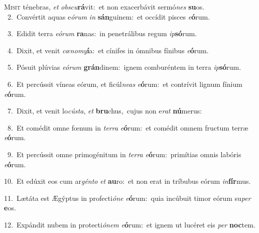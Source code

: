 \lettrine{\initial\textcolor{\initialcolor}{M}}{isit} ténebras, \textit{et} \textit{obs}\-\textit{cu}\textbf{rá}vit:~\star et non exacerbávit sermó\textit{nes} \textbf{su}\-os.\\
{\numbfont\textcolor{\numbcolor}{~2.}}~Convértit aquas e\-\textit{ó}\-\textit{rum} \textit{in} \textbf{sán}\-guinem:~\star et occídit pisces \textit{e}\-\textbf{ó}rum.\par
{\numbfont\textcolor{\numbcolor}{~3.}}~Edidit terra \textit{e}\-\textit{ó}\textit{rum} \textbf{ra}\-nas:~\star in penetrálibus regum \textit{ip}\-\textbf{só}rum.\par
{\numbfont\textcolor{\numbcolor}{~4.}}~Dixit, et venit \textit{cœ}\-\textit{no}\textit{my}\textbf{í}a:~\star et cínifes in ómnibus fínibus \textit{e}\-\textbf{ó}rum.\par
{\numbfont\textcolor{\numbcolor}{~5.}}~Pósuit plúvias \textit{e}\-\textit{ó}\textit{rum} \textbf{grán}\-dinem:~\star ignem comburéntem in terra \textit{ip}\-\textbf{só}rum.\par
{\numbfont\textcolor{\numbcolor}{~6.}}~Et percússit víneas eórum, et ficúl\-\textit{ne}\-\textit{as} \textit{e}\-\textbf{ó}rum:~\star et contrívit lignum fínium \textit{e}\-\textbf{ó}rum.\par
{\numbfont\textcolor{\numbcolor}{~7.}}~Dixit, et venit lo\-\textit{cús}\-\textit{ta}, \textit{et} \textbf{bru}\-chus,~\star cujus non e\textit{rat} \textbf{nú}\-merus:\par
{\numbfont\textcolor{\numbcolor}{~8.}}~Et comédit omne fœnum in \textit{ter}\-\textit{ra} \textit{e}\-\textbf{ó}rum:~\star et comédit omnem fructum terræ \textit{e}\-\textbf{ó}rum.\par
{\numbfont\textcolor{\numbcolor}{~9.}}~Et percússit omne primogénitum in \textit{ter}\-\textit{ra} \textit{e}\-\textbf{ó}rum:~\star primítias omnis labóris \textit{e}\-\textbf{ó}rum.\par
{\numbfont\textcolor{\numbcolor}{10.}}~Et edúxit eos cum ar\-\textit{gén}\-\textit{to} \textit{et} \textbf{au}\-ro:~\star et non erat in tríbubus eórum \textit{in}\-\textbf{fír}mus.\par
{\numbfont\textcolor{\numbcolor}{11.}}~Lætáta est Ægýptus in profecti\-\textit{ó}\-\textit{ne} \textit{e}\-\textbf{ó}rum:~\star quia incúbuit timor eórum su\textit{per} \textbf{e}\-os.\par
{\numbfont\textcolor{\numbcolor}{12.}}~Expándit nubem in protecti\-\textit{ó}\-\textit{nem} \textit{e}\-\textbf{ó}rum:~\star et ignem ut lucéret eis \textit{per} \textbf{noc}\-tem.\par
